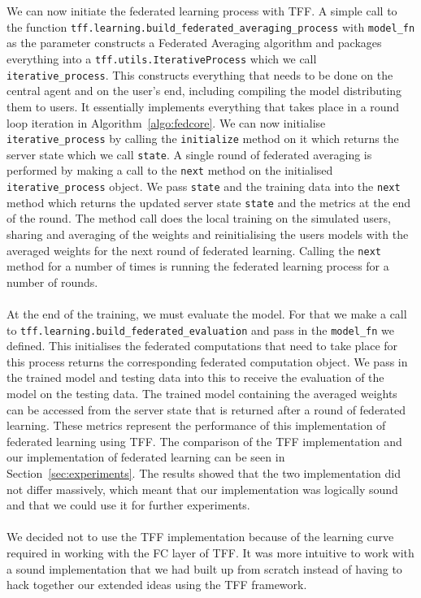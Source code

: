 \documentclass[12pt]{article}
\begin{document}
\\\\
We can now initiate the federated learning process with TFF. A simple call to the function \texttt{tff.learning.build\_federated\_averaging\_process} with \texttt{model\_fn} as the parameter constructs a Federated Averaging algorithm and packages everything into a \texttt{tff.utils.IterativeProcess} which we call \texttt{iterative\_process}. This constructs everything that needs to be done on the central agent and on the user's end, including compiling the model distributing them to users. It essentially implements everything that takes place in a round loop iteration in Algorithm~\ref{algo:fedcore}. We can now initialise \texttt{iterative\_process} by calling the \texttt{initialize} method on it which returns the server state which we call \texttt{state}. A single round of federated averaging is performed by making a call to the \texttt{next} method on the initialised \texttt{iterative\_process} object. We pass \texttt{state} and the training data into the \texttt{next} method which returns the updated server state \texttt{state} and the metrics at the end of the round. The method call does the local training on the simulated users, sharing and averaging of the weights and reinitialising the users models with the averaged weights for the next round of federated learning. Calling the \texttt{next} method for a number of times is running the federated learning process for a number of rounds.
\\\\
At the end of the training, we must evaluate the model. For that we make a call to \texttt{tff.learning.build\_federated\_evaluation} and pass in the \texttt{model\_fn} we defined. This initialises the federated computations that need to take place for this process returns the corresponding federated computation object. We pass in the trained model and testing data into this to receive the evaluation of the model on the testing data. The trained model containing the averaged weights can be accessed from the server state that is returned after a round of federated learning. These metrics represent the performance of this implementation of federated learning using TFF. The comparison of the TFF implementation and our implementation of federated learning can be seen in Section~\ref{sec:experiments}. The results showed that the two implementation did not differ massively, which meant that our implementation was logically sound and that we could use it for further experiments.
\\\\
We decided not to use the TFF implementation because of the learning curve required in working with the FC layer of TFF. It was more intuitive to work with a sound implementation that we had built up from scratch instead of having to hack together our extended ideas using the TFF framework. 
\clearpage
\end{document}
